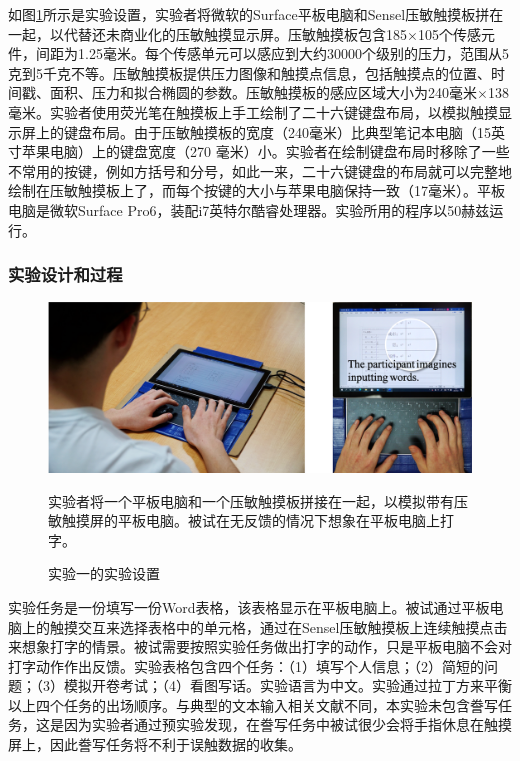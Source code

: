 如图\ref{fig:TypeBoard_study1_illu}所示是实验设置，实验者将微软的Surface平板电脑和Sensel压敏触摸板\cite{Website-Morph}拼在一起，以代替还未商业化的压敏触摸显示屏。压敏触摸板包含185$\times$105个传感元件，间距为1.25毫米。每个传感单元可以感应到大约30000个级别的压力，范围从5克到5千克不等。压敏触摸板提供压力图像和触摸点信息，包括触摸点的位置、时间戳、面积、压力和拟合椭圆的参数。压敏触摸板的感应区域大小为240毫米$\times$138毫米。实验者使用荧光笔在触摸板上手工绘制了二十六键键盘布局，以模拟触摸显示屏上的键盘布局。由于压敏触摸板的宽度（240毫米）比典型笔记本电脑（15英寸苹果电脑）上的键盘宽度（270 毫米）小。实验者在绘制键盘布局时移除了一些不常用的按键，例如方括号和分号，如此一来，二十六键键盘的布局就可以完整地绘制在压敏触摸板上了，而每个按键的大小与苹果电脑保持一致（17毫米）。平板电脑是微软Surface Pro6，装配i7英特尔酷睿处理器。实验所用的程序以50赫兹运行。

\subsubsection{实验设计和过程}

\begin{figure}[!tbh]
	\includegraphics[width=1.0\linewidth]{figures/TypeBoard_study1_illu.png}
	\centering
	\caption*{实验者将一个平板电脑和一个压敏触摸板拼接在一起，以模拟带有压敏触摸屏的平板电脑。被试在无反馈的情况下想象在平板电脑上打字。}
	\caption{实验一的实验设置}
	\label{fig:TypeBoard_study1_illu}
\end{figure}

实验任务是一份填写一份Word表格，该表格显示在平板电脑上。被试通过平板电脑上的触摸交互来选择表格中的单元格，通过在Sensel压敏触摸板上连续触摸点击来想象打字的情景。被试需要按照实验任务做出打字的动作，只是平板电脑不会对打字动作作出反馈。实验表格包含四个任务：（1）填写个人信息；（2）简短的问题；（3）模拟开卷考试；（4）看图写话。实验语言为中文。实验通过拉丁方来平衡以上四个任务的出场顺序。与典型的文本输入相关文献\cite{2003-Metrics, mackenzie2003phrase, 2017-Word}不同，本实验未包含誊写任务，这是因为实验者通过预实验发现，在誊写任务中被试很少会将手指休息在触摸屏上，因此誊写任务将不利于误触数据的收集。

